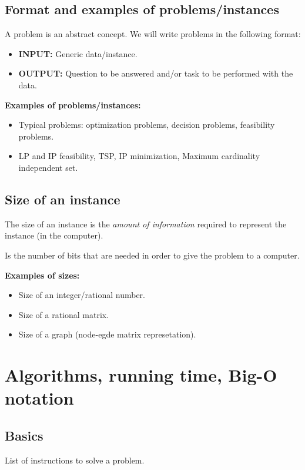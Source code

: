 \documentclass[../open-optimization/open-optimization.tex]{subfiles}
\begin{document}
\subsection{Format and examples of problems/instances}

A problem is an abstract concept. We will write problems in the following format:
\begin{itemize}
	\item {\bf INPUT:} Generic data/instance.
	\item {\bf OUTPUT:} Question to be answered and/or task to be performed with the data.
\end{itemize}


{\bf Examples of problems/instances:}
	\begin{itemize}
	  \item Typical problems: optimization problems, decision problems, feasibility problems.
		\item LP and IP feasibility, TSP, IP minimization, Maximum cardinality independent set.
	\end{itemize}
	
	\subsection{Size of an instance}
	
The size of an instance is the {\em amount of information} required to represent the instance (in the computer).	
	
\begin{definition}
Is the number of bits that are needed in order to give the problem to a computer.
\end{definition}	
	
{\bf Examples of sizes:}
	\begin{itemize}
		\item Size of an integer/rational number.
		\item Size of a rational matrix.
		\item Size of a graph (node-egde matrix represetation).
	\end{itemize}

\section{Algorithms, running time, Big-O notation}
\subsection{Basics}
\begin{definition}[Algorithm]
List of instructions to solve a problem.
\end{definition}
\end{document}
